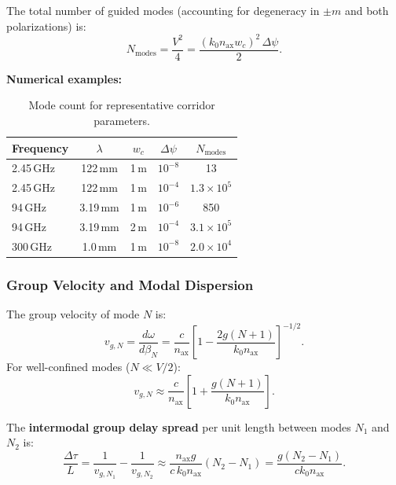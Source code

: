 \documentclass[journal,twocolumn]{IEEEtran}
\begin{document}
The total number of guided modes (accounting for degeneracy in $\pm m$
and both polarizations) is:
\begin{equation}
N_\text{modes} = \frac{V^2}{4}
= \frac{(k_0 n_\text{ax} w_c)^2\,\Delta\psi}{2}.
\label{eq:Nmodes_exact}
\end{equation}

\textbf{Numerical examples:}

\begin{table}[h]
\caption{Mode count for representative corridor parameters.}
\label{tab:mode_count}
\centering
\begin{tabular}{lcccc}
\toprule
Frequency & $\lambda$ & $w_c$ & $\Delta\psi$ & $N_\text{modes}$ \\
\midrule
2.45\,GHz & 122\,mm & 1\,m & $10^{-8}$ & 13 \\
2.45\,GHz & 122\,mm & 1\,m & $10^{-4}$ & $1.3\times10^5$ \\
94\,GHz & 3.19\,mm & 1\,m & $10^{-6}$ & 850 \\
94\,GHz & 3.19\,mm & 2\,m & $10^{-4}$ & $3.1\times10^5$ \\
300\,GHz & 1.0\,mm & 1\,m & $10^{-8}$ & $2.0\times10^4$ \\
\bottomrule
\end{tabular}
\end{table}

\subsubsection{Group Velocity and Modal Dispersion}

The group velocity of mode $N$ is:
\begin{equation}
v_{g,N} = \frac{d\omega}{d\beta_N}
= \frac{c}{n_\text{ax}}\left[1 - \frac{2g(N+1)}{k_0 n_\text{ax}}\right]^{-1/2}.
\label{eq:group_vel}
\end{equation}
For well-confined modes ($N \ll V/2$):
\begin{equation}
v_{g,N} \approx \frac{c}{n_\text{ax}}
\left[1 + \frac{g(N+1)}{k_0 n_\text{ax}}\right].
\end{equation}

The \textbf{intermodal group delay spread} per unit length between
modes $N_1$ and $N_2$ is:
\begin{equation}
\frac{\Delta\tau}{L} = \frac{1}{v_{g,N_1}} - \frac{1}{v_{g,N_2}}
\approx \frac{n_\text{ax} g}{c\,k_0 n_\text{ax}}(N_2 - N_1)
= \frac{g(N_2 - N_1)}{ck_0 n_\text{ax}}.
\label{eq:modal_dispersion}
\end{equation}
\end{document}
